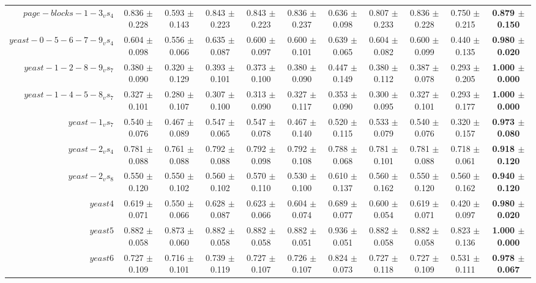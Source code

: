 \begin{table}[!ht]
{\begin{tabular}{r c c c c c c c c c c}
$page-blocks-1-3_vs_4$ & 0.836 $\pm$ 0.228 & 0.593 $\pm$ 0.143 & 0.843 $\pm$ 0.223 & 0.843 $\pm$ 0.223 & 0.836 $\pm$ 0.237 & 0.636 $\pm$ 0.098 & 0.807 $\pm$ 0.233 & 0.836 $\pm$ 0.228 & 0.750 $\pm$ 0.215 & \textbf{0.879 $\pm$ 0.150} \\
$yeast-0-5-6-7-9_vs_4$ & 0.604 $\pm$ 0.098 & 0.556 $\pm$ 0.066 & 0.635 $\pm$ 0.087 & 0.600 $\pm$ 0.097 & 0.600 $\pm$ 0.101 & 0.639 $\pm$ 0.065 & 0.604 $\pm$ 0.082 & 0.600 $\pm$ 0.099 & 0.440 $\pm$ 0.135 & \textbf{0.980 $\pm$ 0.020} \\
$yeast-1-2-8-9_vs_7$ & 0.380 $\pm$ 0.090 & 0.320 $\pm$ 0.129 & 0.393 $\pm$ 0.101 & 0.373 $\pm$ 0.100 & 0.380 $\pm$ 0.090 & 0.447 $\pm$ 0.149 & 0.380 $\pm$ 0.112 & 0.387 $\pm$ 0.078 & 0.293 $\pm$ 0.205 & \textbf{1.000 $\pm$ 0.000} \\
$yeast-1-4-5-8_vs_7$ & 0.327 $\pm$ 0.101 & 0.280 $\pm$ 0.107 & 0.307 $\pm$ 0.100 & 0.313 $\pm$ 0.090 & 0.327 $\pm$ 0.117 & 0.353 $\pm$ 0.090 & 0.300 $\pm$ 0.095 & 0.327 $\pm$ 0.101 & 0.293 $\pm$ 0.177 & \textbf{1.000 $\pm$ 0.000} \\
$yeast-1_vs_7$ & 0.540 $\pm$ 0.076 & 0.467 $\pm$ 0.089 & 0.547 $\pm$ 0.065 & 0.547 $\pm$ 0.078 & 0.467 $\pm$ 0.140 & 0.520 $\pm$ 0.115 & 0.533 $\pm$ 0.079 & 0.540 $\pm$ 0.076 & 0.320 $\pm$ 0.157 & \textbf{0.973 $\pm$ 0.080} \\
$yeast-2_vs_4$ & 0.781 $\pm$ 0.088 & 0.761 $\pm$ 0.088 & 0.792 $\pm$ 0.088 & 0.792 $\pm$ 0.098 & 0.792 $\pm$ 0.108 & 0.788 $\pm$ 0.068 & 0.781 $\pm$ 0.101 & 0.781 $\pm$ 0.088 & 0.718 $\pm$ 0.061 & \textbf{0.918 $\pm$ 0.120} \\
$yeast-2_vs_8$ & 0.550 $\pm$ 0.120 & 0.550 $\pm$ 0.102 & 0.560 $\pm$ 0.102 & 0.570 $\pm$ 0.110 & 0.530 $\pm$ 0.100 & 0.610 $\pm$ 0.137 & 0.560 $\pm$ 0.162 & 0.550 $\pm$ 0.120 & 0.560 $\pm$ 0.162 & \textbf{0.940 $\pm$ 0.120} \\
$yeast4$ & 0.619 $\pm$ 0.071 & 0.550 $\pm$ 0.066 & 0.628 $\pm$ 0.087 & 0.623 $\pm$ 0.066 & 0.604 $\pm$ 0.074 & 0.689 $\pm$ 0.077 & 0.600 $\pm$ 0.054 & 0.619 $\pm$ 0.071 & 0.420 $\pm$ 0.097 & \textbf{0.980 $\pm$ 0.020} \\
$yeast5$ & 0.882 $\pm$ 0.058 & 0.873 $\pm$ 0.060 & 0.882 $\pm$ 0.058 & 0.882 $\pm$ 0.058 & 0.882 $\pm$ 0.051 & 0.936 $\pm$ 0.051 & 0.882 $\pm$ 0.058 & 0.882 $\pm$ 0.058 & 0.823 $\pm$ 0.136 & \textbf{1.000 $\pm$ 0.000} \\
$yeast6$ & 0.727 $\pm$ 0.109 & 0.716 $\pm$ 0.101 & 0.739 $\pm$ 0.119 & 0.727 $\pm$ 0.107 & 0.726 $\pm$ 0.107 & 0.824 $\pm$ 0.073 & 0.727 $\pm$ 0.118 & 0.727 $\pm$ 0.109 & 0.531 $\pm$ 0.111 & \textbf{0.978 $\pm$ 0.067} \\

\end{tabular}}
\end{table}
